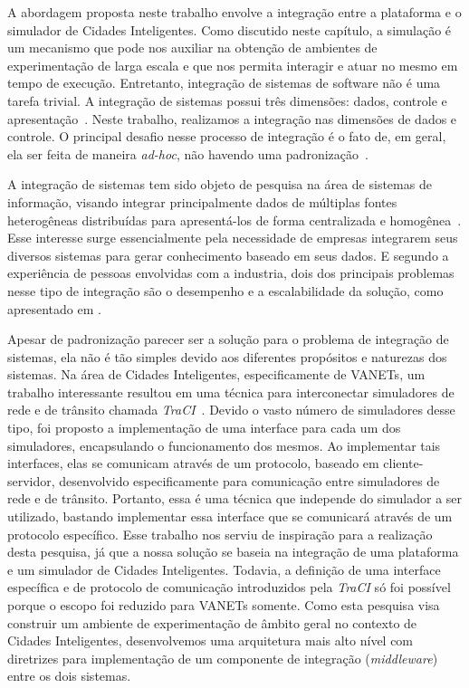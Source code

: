 
A abordagem proposta neste trabalho envolve a integração entre a plataforma e o simulador de Cidades Inteligentes.
Como discutido neste capítulo, a simulação é um mecanismo que pode nos auxiliar na obtenção de ambientes de experimentação de larga escala e que nos permita interagir e atuar no mesmo em tempo de execução.
Entretanto, integração de sistemas de software não é uma tarefa trivial.
A integração de sistemas possui três dimensões: dados, controle e apresentação~\cite{wasserman_1990}.
Neste trabalho, realizamos a integração nas dimensões de dados e controle.
O principal desafio nesse processo de integração é o fato de, em geral, ela ser feita de maneira \textit{ad-hoc}, não havendo uma padronização~\cite{wasserman_1990}.

A integração de sistemas tem sido objeto de pesquisa na área de sistemas de informação, visando integrar principalmente dados de múltiplas fontes heterogêneas distribuídas para apresentá-los de forma
centralizada e homogênea~\cite{genesereth_1997}.
Esse interesse surge essencialmente pela necessidade de empresas integrarem seus diversos sistemas para gerar conhecimento baseado em seus dados.
E segundo a experiência de pessoas envolvidas com a industria, dois dos principais problemas nesse tipo de integração são o desempenho e a escalabilidade da solução, como apresentado em \cite{halevy_2005}.

Apesar de padronização parecer ser a solução para o problema de integração de sistemas, ela não é tão simples devido aos diferentes propósitos e naturezas dos sistemas.
Na área de Cidades Inteligentes, especificamente de VANETs, um trabalho interessante resultou em uma técnica para interconectar simuladores de rede e de trânsito chamada \textit{TraCI}~\cite{wegener_2008}.
Devido o vasto número de simuladores desse tipo, foi proposto a implementação de uma interface para cada um dos simuladores, encapsulando o funcionamento dos mesmos.
Ao implementar tais interfaces, elas se comunicam através de um protocolo, baseado em cliente-servidor, desenvolvido especificamente para comunicação entre simuladores de rede e de trânsito.
Portanto, essa é uma técnica que independe do simulador a ser utilizado, bastando implementar essa interface que se comunicará através de um protocolo específico.
Esse trabalho nos serviu de inspiração para a realização desta pesquisa, já que a nossa solução se baseia na integração de uma plataforma e um simulador de Cidades Inteligentes.
Todavia, a definição de uma interface específica e de protocolo de comunicação introduzidos pela \textit{TraCI} só foi possível porque o escopo foi reduzido para VANETs somente.
Como esta pesquisa visa construir um ambiente de experimentação de âmbito geral no contexto de Cidades Inteligentes, desenvolvemos uma arquitetura mais alto nível com diretrizes para implementação de um
componente de integração (\textit{middleware}) entre os dois sistemas.
